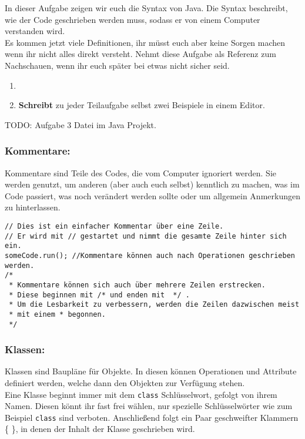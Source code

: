 
\noindent
In dieser Aufgabe zeigen wir euch die Syntax von Java.
Die Syntax beschreibt, wie der Code geschrieben werden muss, sodass er von einem Computer verstanden wird.\\
Es kommen jetzt viele Definitionen, ihr müsst euch aber keine Sorgen machen wenn ihr nicht alles direkt versteht.
Nehmt diese Aufgabe als Referenz zum Nachschauen, wenn ihr euch später bei etwas nicht sicher seid.
\begin{enumerate}
    \item {}
    \item \textbf{Schreibt} zu jeder Teilaufgabe selbst zwei Beispiele in einem Editor. 
\end{enumerate}


{\color{red}TODO: Aufgabe 3 Datei im Java Projekt.}


\subsubsection*{Kommentare:}
Kommentare sind Teile des Codes, die vom Computer ignoriert werden.
Sie werden genutzt, um anderen (aber auch euch selbst) kenntlich zu machen, was im Code passiert, was noch verändert werden sollte oder um allgemein Anmerkungen zu hinterlassen.

\begin{lstlisting}[title=\textbf{Kommentar Beispiel}]
// Dies ist ein einfacher Kommentar über eine Zeile.
// Er wird mit // gestartet und nimmt die gesamte Zeile hinter sich ein.
someCode.run(); //Kommentare können auch nach Operationen geschrieben werden.
/*
 * Kommentare können sich auch über mehrere Zeilen erstrecken.
 * Diese beginnen mit /* und enden mit  */ . 
 * Um die Lesbarkeit zu verbessern, werden die Zeilen dazwischen meist 
 * mit einem * begonnen.
 */
\end{lstlisting}
\lstset{
	basicstyle=\small
}
\subsubsection*{Klassen:}
Klassen sind Baupläne für Objekte. In diesen können Operationen und Attribute definiert werden, welche dann den Objekten zur Verfügung stehen.\\
Eine Klasse beginnt immer mit dem \lstinline{class} Schlüsselwort, gefolgt von ihrem Namen. Diesen könnt ihr fast frei wählen, nur spezielle Schlüsselwörter wie zum Beispiel \lstinline{class} sind verboten. Anschließend folgt ein Paar geschweifter Klammern \{ \}, in denen der Inhalt der Klasse geschrieben wird.


